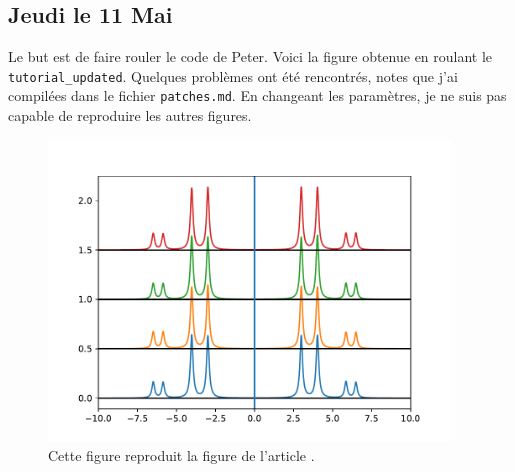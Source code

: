 \documentclass{subfiles}[../main.tex]
\begin{document}
        \subsection{Jeudi le 11 Mai} %
        \label{sub:Jeudi le 11 Mai}
            Le but est de faire rouler le code de Peter. Voici la figure obtenue
            en roulant le \texttt{tutorial\_updated}. Quelques problèmes ont été
            rencontrés, notes que j'ai compilées dans le fichier
            \texttt{patches.md}. En changeant les paramètres, je ne suis pas
            capable de reproduire les autres figures.
            \begin{figure}[h!]
                \begin{center}
                    \includegraphics[width=0.95\textwidth]{figs/fig_tutorial.pdf}
                \end{center}
                \caption{Cette figure reproduit la figure de l'article
                \cite{peter}.}
                \label{fig:}
            \end{figure}



\end{document}
